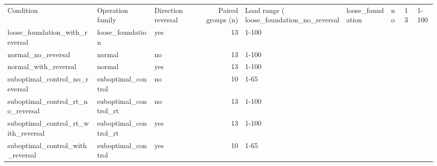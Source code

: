 \begin{tabular}{lllrl}
\toprule
Condition & Operation family & Direction reversal & Paired groups (n) & Load range (%
\midrule
loose_foundation_no_reversal & loose_foundation & no & 13 & 1-100 \\
loose_foundation_with_reversal & loose_foundation & yes & 13 & 1-100 \\
normal_no_reversal & normal & no & 13 & 1-100 \\
normal_with_reversal & normal & yes & 13 & 1-100 \\
suboptimal_control_no_reversal & suboptimal_control & no & 10 & 1-65 \\
suboptimal_control_rt_no_reversal & suboptimal_control_rt & no & 13 & 1-100 \\
suboptimal_control_rt_with_reversal & suboptimal_control_rt & yes & 13 & 1-100 \\
suboptimal_control_with_reversal & suboptimal_control & yes & 10 & 1-65 \\
\bottomrule
\end{tabular}
